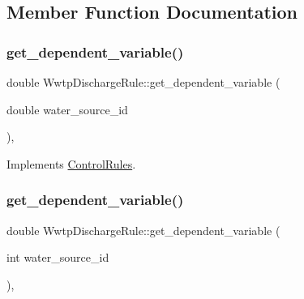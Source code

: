\subsection{Member Function Documentation}
\mbox{\label{classWwtpDischargeRule_a4cea07bf746d200c9ca3018405a77a46_a4cea07bf746d200c9ca3018405a77a46}} 
\subsubsection{\texorpdfstring{get\+\_\+dependent\+\_\+variable()}{get\_dependent\_variable()}\hspace{0.1cm}{\footnotesize\ttfamily [1/4]}}
{\footnotesize\ttfamily double Wwtp\+Discharge\+Rule\+::get\+\_\+dependent\+\_\+variable (\begin{DoxyParamCaption}\item[{double}]{water\+\_\+source\+\_\+id }\end{DoxyParamCaption})\hspace{0.3cm}{\ttfamily [override]}, {\ttfamily [virtual]}}



Implements \mbox{\hyperlink{classControlRules_a749c604121ebb1df808df9cd957a09f1_a749c604121ebb1df808df9cd957a09f1}{Control\+Rules}}.

\mbox{\label{classWwtpDischargeRule_a3338c0fc43d656a6730ca72dd5d3e51e_a3338c0fc43d656a6730ca72dd5d3e51e}} 
\subsubsection{\texorpdfstring{get\+\_\+dependent\+\_\+variable()}{get\_dependent\_variable()}\hspace{0.1cm}{\footnotesize\ttfamily [2/4]}}
{\footnotesize\ttfamily double Wwtp\+Discharge\+Rule\+::get\+\_\+dependent\+\_\+variable (\begin{DoxyParamCaption}\item[{int}]{water\+\_\+source\+\_\+id }\end{DoxyParamCaption})\hspace{0.3cm}{\ttfamily [override]}, {\ttfamily [virtual]}}



